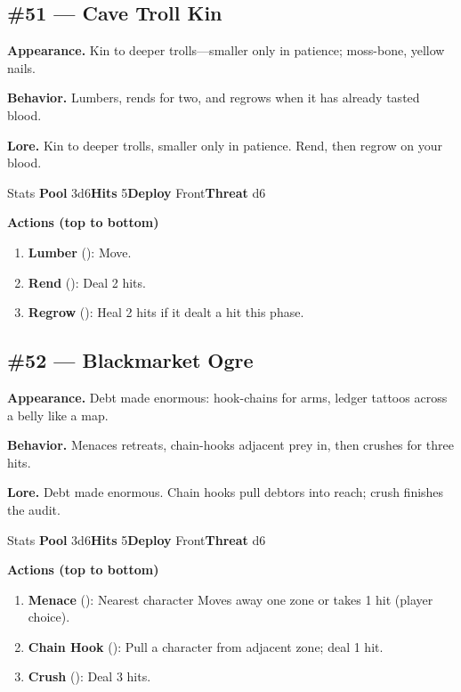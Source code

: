 \subsection*{\#51 --- Cave Troll Kin}

\textbf{Appearance.} Kin to deeper trolls---smaller only in patience; moss-bone, yellow nails.

\textbf{Behavior.} Lumbers, rends for two, and regrows when it has already tasted blood.

\textbf{Lore.} Kin to deeper trolls, smaller only in patience. Rend, then regrow on your blood.

\begin{monsterentry}{Stats}
\textbf{Pool} 3d6\quad\textbf{Hits} 5\quad\textbf{Deploy} Front\quad\textbf{Threat} d6

\textbf{Actions (top to bottom)}
\begin{enumerate}\setlength{\itemsep}{0.15em}\setlength{\parskip}{0pt}
  \item \textbf{Lumber} (\easy): Move.
  \item \textbf{Rend} (\medium): Deal 2 hits.
  \item \textbf{Regrow} (\hard): Heal 2 hits if it dealt a hit this phase.
\end{enumerate}
\end{monsterentry}

\subsection*{\#52 --- Blackmarket Ogre}

\textbf{Appearance.} Debt made enormous: hook-chains for arms, ledger tattoos across a belly like a map.

\textbf{Behavior.} Menaces retreats, chain-hooks adjacent prey in, then crushes for three hits.

\textbf{Lore.} Debt made enormous. Chain hooks pull debtors into reach; crush finishes the audit.

\begin{monsterentry}{Stats}
\textbf{Pool} 3d6\quad\textbf{Hits} 5\quad\textbf{Deploy} Front\quad\textbf{Threat} d6

\textbf{Actions (top to bottom)}
\begin{enumerate}\setlength{\itemsep}{0.15em}\setlength{\parskip}{0pt}
  \item \textbf{Menace} (\easy): Nearest character Moves away one zone or takes 1 hit (player choice).
  \item \textbf{Chain Hook} (\medium): Pull a character from adjacent zone; deal 1 hit.
  \item \textbf{Crush} (\hard): Deal 3 hits.
\end{enumerate}
\end{monsterentry}


